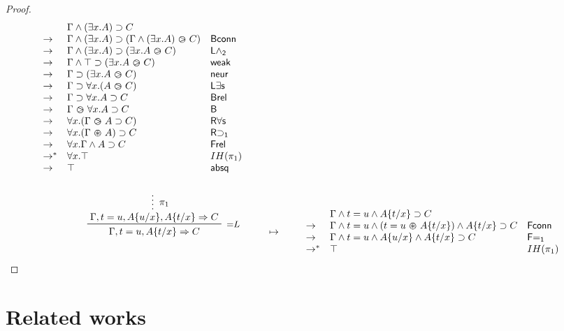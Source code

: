 \begin{proof}
\begin{align*}
\begin{array}{lll}
            & \Gamma \land (\exists x. A) \limp C & \\
      \step & \Gamma \land (\exists x. A) \limp (\Gamma \land (\exists x. A) \back C) & \mathsf{Bconn} \\
      \step & \Gamma \land (\exists x. A) \limp (\exists x. A \back C) & \mathsf{L\land_2} \\
      \step & \Gamma \land \top \limp (\exists x. A \back C) & \mathsf{weak} \\
      \step & \Gamma \limp (\exists x. A \back C) & \mathsf{neur} \\
      \step & \Gamma \limp \forall x. (A \back C) & \mathsf{L\exists s} \\
      \step & \Gamma \limp \forall x. A \limp C & \mathsf{Brel} \\
      \step & \Gamma \back \forall x. A \limp C & \mathsf{B} \\
      \step & \forall x. (\Gamma \back A \limp C) & \mathsf{R\forall s} \\
      \step & \forall x. (\Gamma \forw A) \limp C & \mathsf{R{\limp}_1} \\
      \step & \forall x. \Gamma \land A \limp C & \mathsf{Frel} \\
      \steps & \forall x. \top & IH(\pi_1) \\
      \step & \top & \mathsf{absq}
    \end{array}
    \\\\
    \R[{=}L]
      {\summ[$\pi_1$]{\Gamma, t = u, \subst{A}{u}{x}, \subst{A}{t}{x} \seq C}}
      {\Gamma, t = u, \subst{A}{t}{x} \seq C}
    &\mt
    \begin{array}{lll}
            & \Gamma \land t = u \land \subst{A}{t}{x} \limp C & \\
      \step & \Gamma \land t = u \land (t = u \forw \subst{A}{t}{x}) \land \subst{A}{t}{x} \limp C & \mathsf{Fconn} \\
      \step & \Gamma \land t = u \land \subst{A}{u}{x} \land \subst{A}{t}{x} \limp C & \mathsf{F{=}_1} \\
      \steps & \top & IH(\pi_1)
    \end{array}
  \end{align*}
\end{proof}

\section{Related works}

